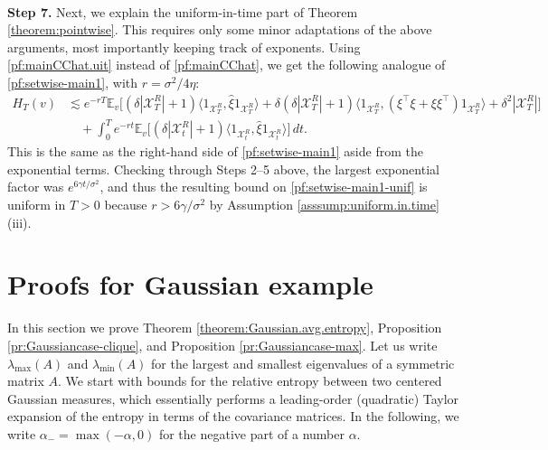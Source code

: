 \documentclass[11pt,reqno]{amsart}
\numberwithin{equation}{section}
\theoremstyle{definition}
\def\E{{\mathbb E}}
\def\X{{\mathcal X}}
\begin{document}
{ \ }

\noindent\textbf{Step 7.} Next, we explain the uniform-in-time part of Theorem \ref{theorem:pointwise}. This requires only some minor adaptations of the above arguments, most importantly keeping track of exponents. Using \eqref{pf:mainCChat.uit} instead of \eqref{pf:mainCChat}, we get the following analogue of \eqref{pf:setwise-main1}, with $r= \sigma^2/4\eta$: \begin{equation} \begin{split} H_{T}(v) & \lesssim e^{-rT}\E_v\Big[(\delta|\X_T^{R}| +1)\langle 1_{\X_T^{R}}, \widehat{\xi} 1_{\X_T^{R}}\rangle + \delta (\delta|\X_T^{R}|+1)\langle 1_{\X_T^{R}}, (\xi^\top \xi + \xi\xi^\top) 1_{\X_T^{R}}\rangle + \delta^2 |\X_T^{R}|\Big] \\ &\quad + \int_0^T e^{-rt}\E_v\big[(\delta |\X_t^{R}|+1) \langle 1_{\X_t^{R}}, \widehat{\xi} 1_{\X_t^{R}}\rangle \big]\,dt. \end{split} \label{pf:setwise-main1-unif} \end{equation} This is the same as the right-hand side of \eqref{pf:setwise-main1} aside from the exponential terms. Checking through Steps 2--5 above, the largest exponential factor was $e^{6\gamma t/\sigma^2}$, and thus the resulting bound on \eqref{pf:setwise-main1-unif} is uniform in $T > 0$ because $r > 6\gamma/\sigma^2$ by Assumption \ref{asssump:uniform.in.time}(iii). \hfill \qedsymbol
\section{Proofs for Gaussian example} \label{se:gaussianproofs}

In this section we prove Theorem \ref{theorem:Gaussian.avg.entropy}, Proposition \ref{pr:Gaussiancase-clique}, and Proposition \ref{pr:Gaussiancase-max}.
Let us write $\lambda_{\mathrm{max}}(A)$ and $\lambda_{\mathrm{min}}(A)$ for the largest and smallest eigenvalues of a symmetric matrix $A$.
We start with bounds for the relative entropy between two centered Gaussian measures, which essentially performs a leading-order (quadratic) Taylor expansion of the entropy in terms of the covariance matrices. In the following, we write $\alpha_-=\max(-\alpha,0)$ for the negative part of a number $\alpha$.
\end{document}
